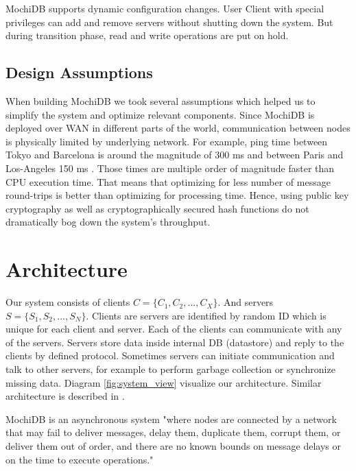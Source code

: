 \documentclass[letterpaper,twocolumn,10pt]{article}
\begin{document}
MochiDB supports dynamic configuration changes. User Client with special privileges can add and remove servers without shutting down the system. But during transition phase, read and write operations are put on hold.

\subsection{Design Assumptions}
When building MochiDB we took several assumptions which helped us to simplify the system and optimize relevant components. Since MochiDB is deployed over WAN in different parts of the world, communication between nodes is physically limited by underlying network. For example, ping time between Tokyo and Barcelona is around the magnitude of 300 ms and between Paris and Los-Angeles 150 ms \cite{PingLatencies}. Those times are multiple order of magnitude faster than CPU execution time. That means that optimizing for less number of message round-trips is better than optimizing for processing time. Hence, using public key cryptography as well as cryptographically secured hash functions do not dramatically bog down the system's throughput. 

\section{Architecture}

Our system consists of clients \( C = \{ C_{1},C_{2}, ..., C_{X} \} \). And servers \( S = \{ S_{1}, S_{2}, ..., S_{N} \} \). Clients are servers are identified by random ID which is unique for each client and server. Each of the clients can communicate with any of the servers. Servers store data inside internal DB (datastore) and reply to the clients by defined protocol. Sometimes servers can initiate communication and talk to other servers, for example to perform garbage collection or synchronize missing data.  Diagram \ref{fig:system_view} visualize our architecture. Similar architecture is described in \cite{HQ_replication}.

MochiDB is an asynchronous system "where nodes are connected by a network that may fail to deliver messages, delay them, duplicate them, corrupt them, or
deliver them out of order, and there are no known bounds on message delays or on the time to execute operations." \cite{HQ_replication}
\end{document}
